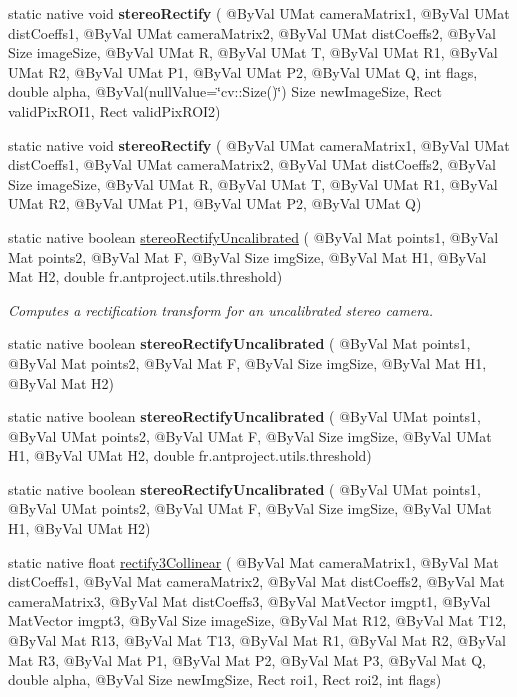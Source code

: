 \begin{DoxyCompactItemize}
\item 
static native void {\bfseries stereo\+Rectify} ( @By\+Val U\+Mat camera\+Matrix1, @By\+Val U\+Mat dist\+Coeffs1, @By\+Val U\+Mat camera\+Matrix2, @By\+Val U\+Mat dist\+Coeffs2, @By\+Val Size image\+Size, @By\+Val U\+Mat R, @By\+Val U\+Mat T, @By\+Val U\+Mat R1, @By\+Val U\+Mat R2, @By\+Val U\+Mat P1, @By\+Val U\+Mat P2, @By\+Val U\+Mat Q, int flags, double alpha, @By\+Val(null\+Value=\char`\"{}cv\+::\+Size()\char`\"{}) Size new\+Image\+Size, Rect valid\+Pix\+R\+O\+I1, Rect valid\+Pix\+R\+O\+I2)
\item 
static native void {\bfseries stereo\+Rectify} ( @By\+Val U\+Mat camera\+Matrix1, @By\+Val U\+Mat dist\+Coeffs1, @By\+Val U\+Mat camera\+Matrix2, @By\+Val U\+Mat dist\+Coeffs2, @By\+Val Size image\+Size, @By\+Val U\+Mat R, @By\+Val U\+Mat T, @By\+Val U\+Mat R1, @By\+Val U\+Mat R2, @By\+Val U\+Mat P1, @By\+Val U\+Mat P2, @By\+Val U\+Mat Q)
\item 
static native boolean \hyperlink{group__calib3d_ga2a00c796082466a7d1000418118e02d2}{stereo\+Rectify\+Uncalibrated} ( @By\+Val Mat points1, @By\+Val Mat points2, @By\+Val Mat F, @By\+Val Size img\+Size, @By\+Val Mat H1, @By\+Val Mat H2, double fr.antproject.utils.threshold)
\begin{DoxyCompactList}\small\item\em Computes a rectification transform for an uncalibrated stereo camera. \end{DoxyCompactList}\item 
static native boolean {\bfseries stereo\+Rectify\+Uncalibrated} ( @By\+Val Mat points1, @By\+Val Mat points2, @By\+Val Mat F, @By\+Val Size img\+Size, @By\+Val Mat H1, @By\+Val Mat H2)
\item 
static native boolean {\bfseries stereo\+Rectify\+Uncalibrated} ( @By\+Val U\+Mat points1, @By\+Val U\+Mat points2, @By\+Val U\+Mat F, @By\+Val Size img\+Size, @By\+Val U\+Mat H1, @By\+Val U\+Mat H2, double fr.antproject.utils.threshold)
\item 
static native boolean {\bfseries stereo\+Rectify\+Uncalibrated} ( @By\+Val U\+Mat points1, @By\+Val U\+Mat points2, @By\+Val U\+Mat F, @By\+Val Size img\+Size, @By\+Val U\+Mat H1, @By\+Val U\+Mat H2)
\item 
static native float \hyperlink{group__calib3d_ga44e3e2ed99710a5b0679459a2988bbd9}{rectify3\+Collinear} ( @By\+Val Mat camera\+Matrix1, @By\+Val Mat dist\+Coeffs1, @By\+Val Mat camera\+Matrix2, @By\+Val Mat dist\+Coeffs2, @By\+Val Mat camera\+Matrix3, @By\+Val Mat dist\+Coeffs3, @By\+Val Mat\+Vector imgpt1, @By\+Val Mat\+Vector imgpt3, @By\+Val Size image\+Size, @By\+Val Mat R12, @By\+Val Mat T12, @By\+Val Mat R13, @By\+Val Mat T13, @By\+Val Mat R1, @By\+Val Mat R2, @By\+Val Mat R3, @By\+Val Mat P1, @By\+Val Mat P2, @By\+Val Mat P3, @By\+Val Mat Q, double alpha, @By\+Val Size new\+Img\+Size, Rect roi1, Rect roi2, int flags)

\end{DoxyCompactItemize}

